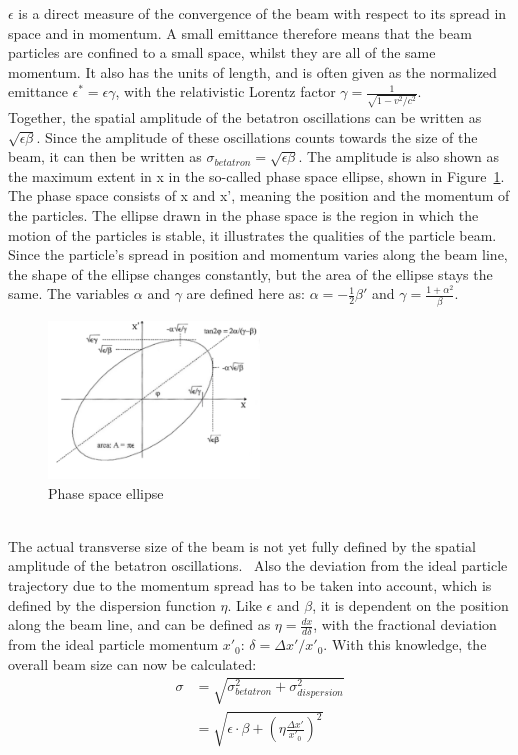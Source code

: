 $\epsilon$ is a direct measure of the convergence of the beam with respect to its spread in space and in momentum.
A small emittance therefore means that the beam particles are confined to a small space, whilst they are all of the same momentum.
It also has the units of length, and is often given as the normalized emittance $\epsilon^* = \epsilon\gamma$, with the relativistic Lorentz factor $\gamma=\frac{1}{\sqrt{1-v^2/c^2}}$.\\
Together, the spatial amplitude of the betatron oscillations can be written as $\sqrt{\epsilon\beta}$.
Since the amplitude of these oscillations counts towards the size of the beam, it can then be written as $\sigma_{betatron} = \sqrt{\epsilon\beta}$.
The amplitude is also shown as the maximum extent in x in the so-called phase space ellipse, shown in Figure~\ref{fig:PhaseSpaceEllipse}.
The phase space consists of x and x', meaning the position and the momentum of the particles.
The ellipse drawn in the phase space is the region in which the motion of the particles is stable, it illustrates the qualities of the particle beam.
Since the particle's spread in position and momentum varies along the beam line, the shape of the ellipse changes constantly, but the area of the ellipse stays the same.
The variables $\alpha$ and $\gamma$ are defined here as: $\alpha = -\frac12\beta'$ and $\gamma = \frac{1+\alpha^2}{\beta}$.~\cite[cf. p. 283ff]{Wangler}
\begin{figure}[h]
\centering
\includegraphics[width=0.5\textwidth]{Figures/PhaseSpaceEllipse_w_AxisTitles.png}
\caption[Phase space ellipse]{Phase space ellipse~\cite[based on p. 158]{Wiedemann}}
\label{fig:PhaseSpaceEllipse}
\end{figure}
\\The actual transverse size of the beam is not yet fully defined by the spatial amplitude of the betatron oscillations.~\cite[cf. p. 108ff]{Conte}
Also the deviation from the ideal particle trajectory due to the momentum spread has to be taken into account, which is defined by the dispersion function $\eta$.
Like $\epsilon$ and $\beta$, it is dependent on the position along the beam line, and can be defined as $\eta = \frac{dx}{d\delta}$, with the fractional deviation from the ideal particle momentum $x'_0$: $\delta = \Delta x'/x'_0$.
With this knowledge, the overall beam size can now be calculated:
\begin{align}
 \sigma&=\sqrt{\sigma^2_{betatron}+\sigma^2_{dispersion}}\\
 &=\sqrt{\epsilon\cdot\beta+\left(\eta\frac{\Delta x'}{x'_0}\right)^2}
\end{align}


